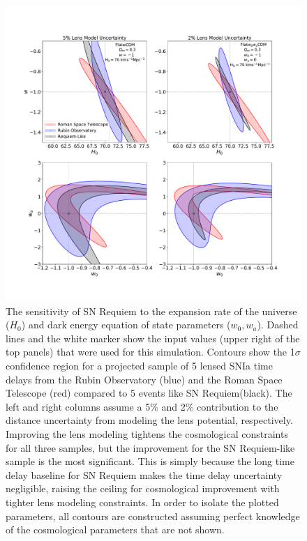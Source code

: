 \documentclass[12pt,dvipsnames]{article}
\def\SNABC{SN Requiem\xspace}
\begin{document}
\clearpage
\begin{figure}
    \centering
    \includegraphics[draft=False,trim={2cm, 3cm, 3cm, 4cm},clip,width=\textwidth]{Paper/Figures/snrequiem_hw_w0wa_apples_to_lsst_ngrst_4panel.pdf}
    \caption{  
    The sensitivity of SN Requiem to the expansion rate of the universe ($H_0$) and dark energy equation of state parameters ($w_0, w_a$). Dashed lines and the white marker show the input values (upper right of the top panels) that were used for this simulation. Contours show the 1$\sigma$ confidence region for a projected sample of 5 lensed SNIa time delays from the Rubin Observatory (blue) and the Roman Space Telescope (red) compared to 5 events like \SNABC (black).  The left and right columns assume a 5\% and 2\% contribution to the distance uncertainty from modeling the lens potential, respectively. Improving the lens modeling tightens the cosmological constraints for all three samples, but the improvement for the \SNABC-like sample is the most significant.  This is simply because the long time delay baseline for \SNABC makes the time delay uncertainty negligible, raising the ceiling for cosmological improvement with tighter lens modeling constraints.  In order to isolate the plotted parameters, all contours are constructed assuming perfect knowledge of the cosmological parameters that are not shown. 
    }
    \label{fig:cosmo}
\end{figure}
\end{document}
